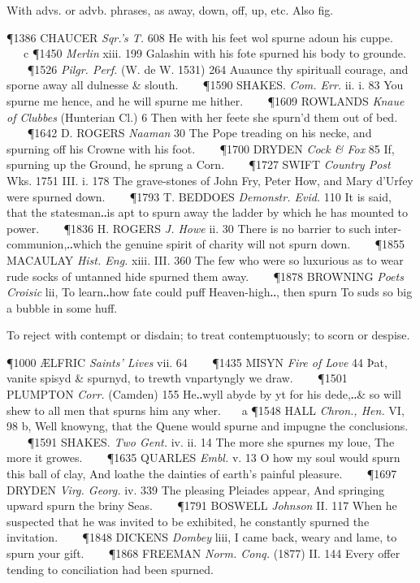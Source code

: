 \begin{description}[wide, labelwidth=!, labelindent=0pt]
\begin{myenumerate}
 With advs. or advb. phrases, as away, down, off, up, etc. Also fig.

\P 1386 CHAUCER  \textit{Sqr.'s T.} 608 He with his feet wol spurne adoun his cuppe.    c 
\P 1450  \textit{Merlin} xiii. 199 Galashin with his fote spurned his body to grounde.    
\P 1526  \textit{Pilgr. Perf.} (W. de W. 1531) 264 Auaunce thy spirituall courage, and sporne away all dulnesse \& slouth.    
\P 1590 SHAKES.  \textit{Com. Err.} ii. i. 83 You spurne me hence, and he will spurne me hither.    
\P 1609 ROWLANDS  \textit{Knaue of Clubbes} (Hunterian Cl.) 6 Then with her feete she spurn'd them out of bed.    
\P 1642 D. ROGERS  \textit{Naaman} 30 The Pope treading on his necke, and spurning off his Crowne with his foot.    
\P 1700 DRYDEN  \textit{Cock \& Fox} 85 If, spurning up the Ground, he sprung a Corn.    
\P 1727 SWIFT  \textit{Country Post} Wks. 1751 III.  i. 178 The grave-stones of John Fry, Peter How, and Mary d'Urfey were spurned down.    
\P 1793 T. BEDDOES  \textit{Demonstr. Evid.} 110 It is said, that the statesman‥is apt to spurn away the ladder by which he has mounted to power.    
\P 1836 H. ROGERS  \textit{J. Howe} ii. 30 There is no barrier to such inter-communion,‥which the genuine spirit of charity will not spurn down.    
\P 1855 MACAULAY  \textit{Hist. Eng.} xiii. III. 360 The few who were so luxurious as to wear rude socks of untanned hide spurned them away.    
\P 1878 BROWNING  \textit{Poets Croisic} lii, To learn‥how fate could puff Heaven-high‥, then spurn To suds so big a bubble in some huff.

 To reject with contempt or disdain; to treat contemptuously; to scorn or despise.

\P 1000 ÆLFRIC  \textit{Saints' Lives} vii. 64     
\P 1435 MISYN  \textit{Fire of Love} 44 Þat, vanite spisyd \& spurnyd, to trewth vnpartyngly we draw.    
\P 1501 PLUMPTON  \textit{Corr.} (Camden) 155 He‥wyll abyde by yt for his dede,‥\& so will shew to all men that spurns him any wher.    a 
\P 1548 HALL  \textit{Chron., Hen.} VI, 98 b, Well knowyng, that the Quene would spurne and impugne the conclusions.    
\P 1591 SHAKES.  \textit{Two Gent.} iv. ii. 14 The more she spurnes my loue, The more it growes.    
\P 1635 QUARLES  \textit{Embl.} v. 13 O how my soul would spurn this ball of clay, And loathe the dainties of earth's painful pleasure.    
\P 1697 DRYDEN  \textit{Virg. Georg.} iv. 339 The pleasing Pleiades appear, And springing upward spurn the briny Seas.    
\P 1791 BOSWELL  \textit{Johnson} II. 117 When he suspected that he was invited to be exhibited, he constantly spurned the invitation.    
\P 1848 DICKENS  \textit{Dombey} liii, I came back, weary and lame, to spurn your gift.    
\P 1868 FREEMAN  \textit{Norm. Conq.} (1877) II. 144 Every offer tending to conciliation had been spurned.


\end{myenumerate}
\end{description}
